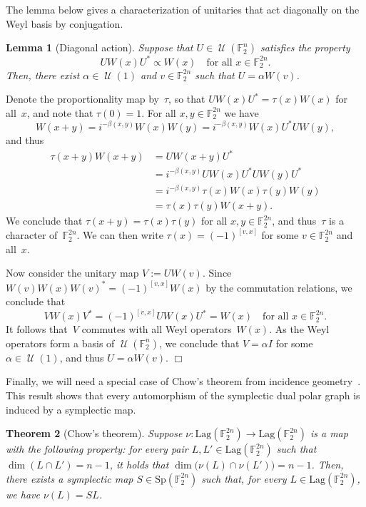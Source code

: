 \documentclass[11pt]{amsart}
\newcommand{\Lag}{\mathrm{Lag}}
\newcommand{\F}{\mathbb{F}} %
\newcommand{\Sp}{\mathrm{Sp}}
\DeclareMathOperator{\U}{\mathcal{U}}
\theoremstyle{plain}
\newtheorem{theorem}{Theorem}[section]
\newtheorem{lemma}[theorem]{Lemma}
\theoremstyle{definition}
\theoremstyle{remark}
\renewenvironment{proof}[1][]{
    	\begin{trivlist}
     	\item[\hspace{\labelsep}{\em\noindent Proof#1:\/}]}
     	{{\hfill$\Box$}
    	\end{trivlist}
  }
\begin{document}
The lemma below gives a characterization of unitaries that act diagonally on the Weyl basis by conjugation.

\begin{lemma}[Diagonal action] \label{lem:diag_Weyl}
    Suppose that $U \in \U(\F_2^n)$ satisfies the property
    $$U W(x) U^* \propto W(x) \quad \text{for all $x\in \F_2^{2n}$.}$$
    Then, there exist $\alpha\in \U(1)$ and $v\in \F_2^{2n}$ such that $U = \alpha W(v)$.
\end{lemma}

\begin{proof}
Denote the proportionality map by~$\tau$, so that $U W(x) U^* = \tau(x) W(x)$ for all~$x$, and note that $\tau(0) = 1$.
For all $x, y\in \F_2^{2n}$ we have
$$W(x+y) = i^{-\beta(x,y)} W(x) W(y) = i^{-\beta(x,y)} W(x) U^*U W(y),$$
and thus
\begin{align*}
    \tau(x+y) W(x+y) &= U W(x+y) U^* \\
    &=i^{-\beta(x,y)} UW(x)U^* UW(y)U^* \\
    &= i^{-\beta(x,y)} \tau(x)W(x) \tau(y)W(y) \\
    &= \tau(x)\tau(y) W(x+y).
\end{align*}
We conclude that $\tau(x+y) = \tau(x)\tau(y)$ for all $x, y\in \F_2^{2n}$, and thus~$\tau$ is a character of~$\F_2^{2n}$.
We can then write $\tau(x) = (-1)^{[v, x]}$ for some $v\in \F_2^{2n}$ and all~$x$.

Now consider the unitary map $V := UW(v)$.
Since $W(v)W(x)W(v)^* = (-1)^{[v,x]} W(x)$ by the commutation relations, we conclude that
$$VW(x)V^* = (-1)^{[v,x]} UW(x)U^* = W(x) \quad \text{for all $x\in \F_2^{2n}$.}$$
It follows that~$V$ commutes with all Weyl operators~$W(x)$.
As the Weyl operators form a basis of $\U(\F_2^n)$, we conclude that $V=\alpha I$ for some $\alpha\in \U(1)$, and thus $U = \alpha W(v)$.
\end{proof}

Finally, we will need a special case of Chow's theorem from incidence geometry~\cite{Chow}.
This result shows that every automorphism of the symplectic dual polar graph is induced by a symplectic map.

\begin{theorem}[Chow's theorem]\label{thm:chow}
    Suppose $\nu:\Lag(\F_2^{2n})\to \Lag(\F_2^{2n})$ is a map with the following property:
    for every pair $L,L'\in \Lag(\F_2^{2n})$ such that $\dim(L\cap L') = n-1$, it holds that $\dim\big(\nu(L)\cap \nu(L')\big) = n-1$.
    Then, there exists a symplectic map $S\in \Sp(\F_2^{2n})$ such that, for every $L\in \Lag(\F_2^{2n})$, we have $\nu(L) = SL$.
\end{theorem}
\end{document}
